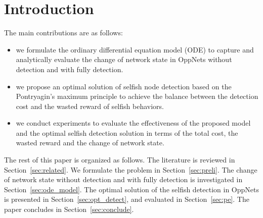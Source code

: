 \section{Introduction}
\label{sec:intro}
The main contributions are as follows:

\begin{itemize}
\item {we formulate the ordinary differential equation model (ODE)
to capture and analytically evaluate the change of network state
in OppNets without detection and with fully detection.}
\item {we propose an optimal solution of selfish node detection
based on the Pontryagin's maximum principle
to achieve the balance between the detection cost 
and the wasted reward of selfish behaviors.
}
\item {we conduct experiments to evaluate 
the effectiveness of the proposed model
and the optimal selfish detection solution in terms of the total cost,
the wasted reward and the change of network state.
}
\end{itemize}

The rest of this paper is organized as follows.
The literature is reviewed in Section~\ref{sec:related}.
We formulate the problem in Section~\ref{sec:preli}.
The change of network state without detection and with fully detection
is investigated in Section~\ref{sec:ode_model}.
The optimal solution of the selfish detection in OppNets
is presented in Section~\ref{sec:opt_detect},
and evaluated in Section~\ref{sec:pe}.
The paper concludes in Section~\ref{sec:conclude}. 
